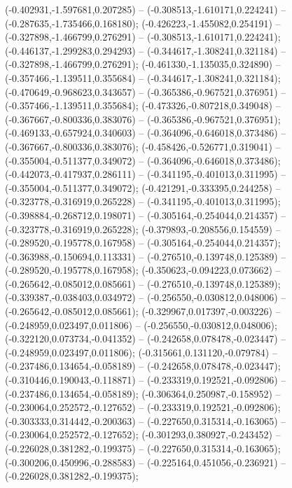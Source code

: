  (-0.402931,-1.597681,0.207285) -- (-0.308513,-1.610171,0.224241) -- (-0.287635,-1.735466,0.168180);
 (-0.426223,-1.455082,0.254191) -- (-0.327898,-1.466799,0.276291) -- (-0.308513,-1.610171,0.224241);
 (-0.446137,-1.299283,0.294293) -- (-0.344617,-1.308241,0.321184) -- (-0.327898,-1.466799,0.276291);
 (-0.461330,-1.135035,0.324890) -- (-0.357466,-1.139511,0.355684) -- (-0.344617,-1.308241,0.321184);
 (-0.470649,-0.968623,0.343657) -- (-0.365386,-0.967521,0.376951) -- (-0.357466,-1.139511,0.355684);
 (-0.473326,-0.807218,0.349048) -- (-0.367667,-0.800336,0.383076) -- (-0.365386,-0.967521,0.376951);
 (-0.469133,-0.657924,0.340603) -- (-0.364096,-0.646018,0.373486) -- (-0.367667,-0.800336,0.383076);
 (-0.458426,-0.526771,0.319041) -- (-0.355004,-0.511377,0.349072) -- (-0.364096,-0.646018,0.373486);
 (-0.442073,-0.417937,0.286111) -- (-0.341195,-0.401013,0.311995) -- (-0.355004,-0.511377,0.349072);
 (-0.421291,-0.333395,0.244258) -- (-0.323778,-0.316919,0.265228) -- (-0.341195,-0.401013,0.311995);
 (-0.398884,-0.268712,0.198071) -- (-0.305164,-0.254044,0.214357) -- (-0.323778,-0.316919,0.265228);
 (-0.379893,-0.208556,0.154559) -- (-0.289520,-0.195778,0.167958) -- (-0.305164,-0.254044,0.214357);
 (-0.363988,-0.150694,0.113331) -- (-0.276510,-0.139748,0.125389) -- (-0.289520,-0.195778,0.167958);
 (-0.350623,-0.094223,0.073662) -- (-0.265642,-0.085012,0.085661) -- (-0.276510,-0.139748,0.125389);
 (-0.339387,-0.038403,0.034972) -- (-0.256550,-0.030812,0.048006) -- (-0.265642,-0.085012,0.085661);
 (-0.329967,0.017397,-0.003226) -- (-0.248959,0.023497,0.011806) -- (-0.256550,-0.030812,0.048006);
 (-0.322120,0.073734,-0.041352) -- (-0.242658,0.078478,-0.023447) -- (-0.248959,0.023497,0.011806);
 (-0.315661,0.131120,-0.079784) -- (-0.237486,0.134654,-0.058189) -- (-0.242658,0.078478,-0.023447);
 (-0.310446,0.190043,-0.118871) -- (-0.233319,0.192521,-0.092806) -- (-0.237486,0.134654,-0.058189);
 (-0.306364,0.250987,-0.158952) -- (-0.230064,0.252572,-0.127652) -- (-0.233319,0.192521,-0.092806);
 (-0.303333,0.314442,-0.200363) -- (-0.227650,0.315314,-0.163065) -- (-0.230064,0.252572,-0.127652);
 (-0.301293,0.380927,-0.243452) -- (-0.226028,0.381282,-0.199375) -- (-0.227650,0.315314,-0.163065);
 (-0.300206,0.450996,-0.288583) -- (-0.225164,0.451056,-0.236921) -- (-0.226028,0.381282,-0.199375);
